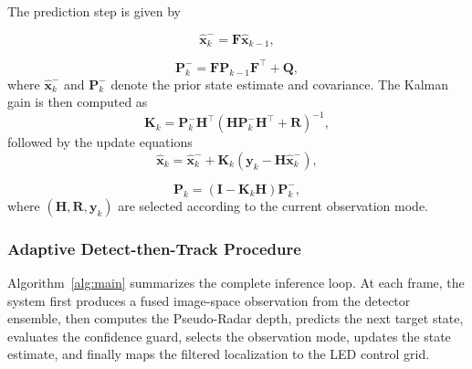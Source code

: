 \documentclass[pdflatex,sn-mathphys-num]{sn-jnl}%
\theoremstyle{thmstyleone}%
\theoremstyle{thmstyletwo}%
\theoremstyle{thmstylethree}%
\begin{document}
The prediction step is given by

\begin{equation}
\hat{\mathbf{x}}_{k}^{-} = \mathbf{F}\hat{\mathbf{x}}_{k-1},
\label{eq:kf_pred_x}
\end{equation}

\begin{equation}
\mathbf{P}_{k}^{-} = \mathbf{F}\mathbf{P}_{k-1}\mathbf{F}^{\top} + \mathbf{Q},
\label{eq:kf_pred_p}
\end{equation}
where $\hat{\mathbf{x}}_{k}^{-}$ and $\mathbf{P}_{k}^{-}$ denote the prior state estimate and covariance.
The Kalman gain is then computed as
\begin{equation}
\mathbf{K}_k = \mathbf{P}_{k}^{-}\mathbf{H}^{\top} \left(\mathbf{H}\mathbf{P}_{k}^{-}\mathbf{H}^{\top} + \mathbf{R}\right)^{-1},
\label{eq:kf_gain}
\end{equation}
followed by the update equations
\begin{equation}
\hat{\mathbf{x}}_k = \hat{\mathbf{x}}_{k}^{-} + \mathbf{K}_k\left(\mathbf{y}_k - \mathbf{H}\hat{\mathbf{x}}_{k}^{-}\right),
\label{eq:kf_update_x}
\end{equation}

\begin{equation}
\mathbf{P}_k = \left(\mathbf{I} - \mathbf{K}_k\mathbf{H}\right)\mathbf{P}_{k}^{-},
\label{eq:kf_update_p}
\end{equation}
where $(\mathbf{H}, \mathbf{R}, \mathbf{y}_k)$ are selected according to the current observation mode.

\subsubsection{Adaptive Detect-then-Track Procedure}

Algorithm~\ref{alg:main} summarizes the complete inference loop. At each frame, the system first produces a fused image-space observation from the detector ensemble, then computes the Pseudo-Radar depth, predicts the next target state, evaluates the confidence guard, selects the observation mode, updates the state estimate, and finally maps the filtered localization to the LED control grid.
\end{document}
